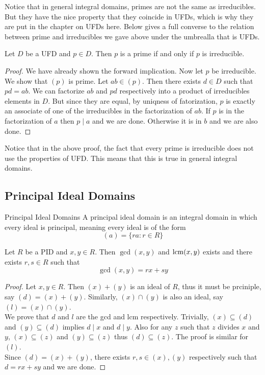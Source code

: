 \documentclass[a4paper]{article}
\begin{document}
Notice that in general integral domains, primes are not the same as irreducibles. But they have the nice property that they coincide in UFDs, which is why they are put in the chapter on UFDs here. Below gives a full converse to the relation between prime and irreducibles we gave above under the umbrealla that is UFDs. 

\begin{prp}{}{} Let $D$ be a UFD and $p\in D$. Then $p$ is a prime if and only if $p$ is irreducible. 
\begin{proof}
We have already shown the forward implication. Now let $p$ be irreducible. We show that $(p)$ is prime. Let $ab\in(p)$. Then there exists $d\in D$ such that $pd=ab$. We can factorize $ab$ and $pd$ respectively into a product of irreducibles elements in $D$. But since they are equal, by uniqness of fatorization, $p$ is exactly an associate of one of the irreducibles in the factorization of $ab$. If $p$ is in the factorization of $a$ then $p\;|\;a$ and we are done. Otherwise it is in $b$ and we are also done. 
\end{proof}
\end{prp}

Notice that in the above proof, the fact that every prime is irreducible does not use the properties of UFD. This means that this is true in general integral domains. 

\subsection{Principal Ideal Domains}
\begin{defn}{Principal Ideal Domains}{} A principal ideal domain is an integral domain in which every ideal is principal, meaning every ideal is of the form $$(a)=\{ra:r\in R\}$$
\end{defn}

\begin{prp}{}{} Let $R$ be a PID and $x,y\in R$. Then $\gcd(x,y)$ and $\operatorname{lcm}(x,y)$ exists and there exists $r,s\in R$ such that $$\gcd(x,y)=rx+sy$$ 
\begin{proof}
Let $x,y\in R$. Then $(x)+(y)$ is an ideal of $R$, thus it must be prciniple, say $(d)=(x)+(y)$. Similarly, $(x)\cap(y)$ is also an ideal, say $(l)=(x)\cap(y)$. \\
We prove that $d$ and $l$ are the gcd and lcm respectively. Trivially, $(x)\subseteq(d)$ and $(y)\subseteq(d)$ implies $d\;|\;x$ and $d\;|\;y$. Also for any $z$ such that $z$ divides $x$ and $y$, $(x)\subseteq(z)$ and $(y)\subseteq(z)$ thus $(d)\subseteq(z)$. The proof is similar for $(l)$. \\
Since $(d)=(x)+(y)$, there exists $r,s\in (x),(y)$ respectively such that $d=rx+sy$ and we are done. 
\end{proof}
\end{prp}
\end{document}
